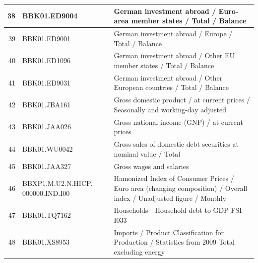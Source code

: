 \documentclass[12pt]{article}
\begin{document}
\begin{table}
\begin{tabular}{rp{5cm}p{11cm}}
  \hline
  38 & BBK01.ED9004 & German investment abroad / Euro-area member states / Total / Balance \\ 
  \hline
  39 & BBK01.ED9001 & German investment abroad / Europe / Total / Balance \\ 
  \hline
  40 & BBK01.ED1096 & German investment abroad / Other EU member states / Total / Balance \\   
  \hline
  41 & BBK01.ED9031 & German investment abroad / Other European countries / Total / Balance \\ 
  \hline
  42 & BBK01.JBA161 & Gross domestic product / at current prices / Seasonally and working-day adjusted \\ 
  \hline
  43 & BBK01.JAA026 & Gross national income (GNP) / at current prices \\ 
  \hline
  44 & BBK01.WU0042 & Gross sales of domestic debt securities at nominal value / Total \\ 
  \hline
  45 & BBK01.JAA327 & Gross wages and salaries \\ 
  \hline
  46 & BBXP1.M.U2.N.HICP. 000000.IND.I00 & Hamonized Index of Consumer Prices / Euro area (changing composition) / Overall index / Unadjusted figure / Monthly \\ 
  \hline
  47 & BBK01.TQ7162 & Households - Household debt to GDP FSI-I033 \\ 
  \hline
  48 & BBK01.XS8953 & Imports / Product Classification for Production / Statistics from 2009 Total excluding energy \\ 
\end{tabular}
\end{table}
\end{document}
